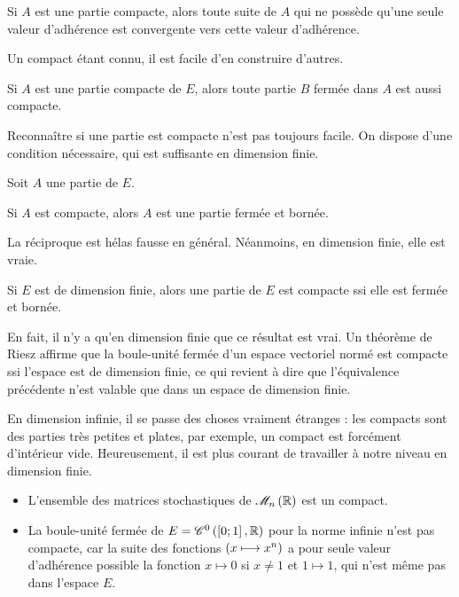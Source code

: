 \begin{prop}
Si \(A\) est une partie compacte, alors toute suite de \(A\) qui ne possède qu'une seule valeur d'adhérence est convergente vers cette valeur d'adhérence.
\end{prop}

Un compact étant connu, il est facile d'en construire d'autres.

\begin{prop}
Si \(A\) est une partie compacte de \(E\), alors toute partie \(B\) fermée dans \(A\) est aussi compacte.
\end{prop}

Reconnaître si une partie est compacte n'est pas toujours facile. On dispose d'une condition nécessaire, qui est suffisante en dimension finie.

\begin{prop}
Soit \(A\) une partie de \(E\).

Si \(A\) est compacte, alors \(A\) est une partie fermée et bornée.
\end{prop}

La réciproque est hélas fausse en général. Néanmoins, en dimension finie, elle est vraie.

\begin{prop}
Si \(E\) est de dimension finie, alors une partie de \(E\) est compacte ssi elle est fermée et bornée.
\end{prop}

\begin{rem}
En fait, il n'y a qu'en dimension finie que ce résultat est vrai. Un théorème de Riesz affirme que la boule-unité fermée d'un espace vectoriel normé est compacte ssi l'espace est de dimension finie, ce qui revient à dire que l'équivalence précédente n'est valable que dans un espace de dimension finie.

En dimension infinie, il se passe des choses vraiment étranges : les compacts sont des parties très petites et plates, par exemple, un compact est forcément d'intérieur vide. Heureusement, il est plus courant de travailler à notre niveau en dimension finie.
\end{rem}

\begin{ex}
\begin{itemize}
    \item L'ensemble des matrices stochastiques de \(\M{n}[\R]\) est un compact. \\
    \item La boule-unité fermée de \(E=\mathscr{C}^{0}\left(\left[0;1\right],\mathbb{R}\right)\) pour la norme infinie n'est pas compacte, car la suite des fonctions \(\left(x\longmapsto x^n\right)\) a pour seule valeur d'adhérence possible la fonction \(x\mapsto0\) si \(x\not=1\) et \(1\mapsto1\), qui n'est même pas dans l'espace \(E\).
\end{itemize}
\end{ex}

